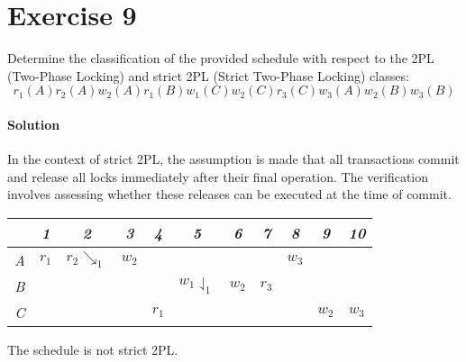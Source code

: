 \section{Exercise 9}

Determine the classification of the provided schedule with respect to the 2PL (Two-Phase Locking) and strict 2PL (Strict Two-Phase Locking) classes:
\[r_1(A) r_2(A) w_2(A) r_1(B) w_1(C) w_2(C) r_3(C) w_3(A) w_2(B) w_3(B)\]

\paragraph*{Solution}
In the context of strict 2PL, the assumption is made that all transactions commit and release all locks immediately after their final operation. 
The verification involves assessing whether these releases can be executed at the time of commit.
\begin{table}[H]
    \centering
    \begin{tabular}{c|cccccccccc}
            & \textit{1} & \textit{2} & \textit{3} & \textit{4} & \textit{5} & \textit{6} & \textit{7} & \textit{8} & \textit{9} & \textit{10} \\ \hline
    \textit{A} & $r_1$      & $r_2\searrow _1$          & $w_2$      &            &            &            &            & $w_3$      &            &             \\
    \textit{B} &            &                           &            &            & $w_1\downharpoonleft_1$      & $w_2$      & $r_3$      &            &            &             \\
    \textit{C} &            &                           &            & $r_1$      &            &            &            &            & $w_2$      & $w_3$      
    \end{tabular}%
\end{table}
The schedule is not strict 2PL.

